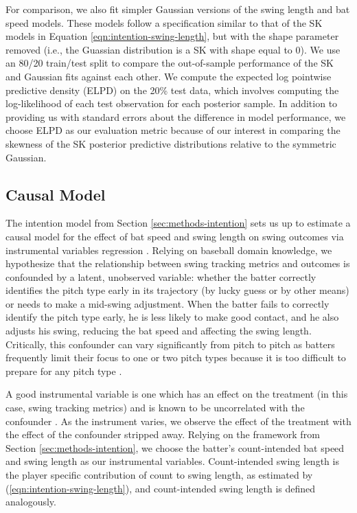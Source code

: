 \documentclass{article}
\begin{document}
    For comparison, we also fit simpler Gaussian versions of the swing length and bat speed models. These models follow a specification similar to that of the SK models in Equation \ref{eqn:intention-swing-length}, but with the shape parameter removed (i.e., the Guassian distribution is a SK with shape equal to 0). We use an 80/20 train/test split to compare the out-of-sample performance of the SK and Gaussian fits against each other. We compute the expected log pointwise predictive density (ELPD) on the 20\% test data, which involves computing the log-likelihood of each test observation for each posterior sample. In addition to providing us with standard errors about the difference in model performance, we choose ELPD as our evaluation metric because of our interest in comparing the skewness of the SK posterior predictive distributions relative to the symmetric Gaussian.

    \subsection{Causal Model}
    \label{sec:methods-causal}

      The intention model from Section \ref{sec:methods-intention} sets us up to estimate a causal model for the effect of bat speed and swing length on swing outcomes via instrumental variables regression \citep{bollen_instrumental_2012}. Relying on baseball domain knowledge, we hypothesize that the relationship between swing tracking metrics and outcomes is confounded by a latent, unobserved variable: whether the batter correctly identifies the pitch type early in its trajectory (by lucky guess or by other means) or needs to make a mid-swing adjustment. When the batter fails to correctly identify the pitch type early, he is less likely to make good contact, and he also adjusts his swing, reducing the bat speed and affecting the swing length. Critically, this confounder can vary significantly from pitch to pitch as batters frequently limit their focus to one or two pitch types because it is too difficult to prepare for any pitch type \citep{gray_markov_2002}.

      A good instrumental variable is one which has an effect on the treatment (in this case, swing tracking metrics) and is known to be uncorrelated with the confounder \citep{bollen_instrumental_2012}. As the instrument varies, we observe the effect of the treatment with the effect of the confounder stripped away. Relying on the framework from Section \ref{sec:methods-intention}, we choose the batter's count-intended bat speed and swing length as our instrumental variables. Count-intended swing length is the player specific contribution of count to swing length, as estimated by (\ref{eqn:intention-swing-length}), and count-intended swing length is defined analogously.
\end{document}
